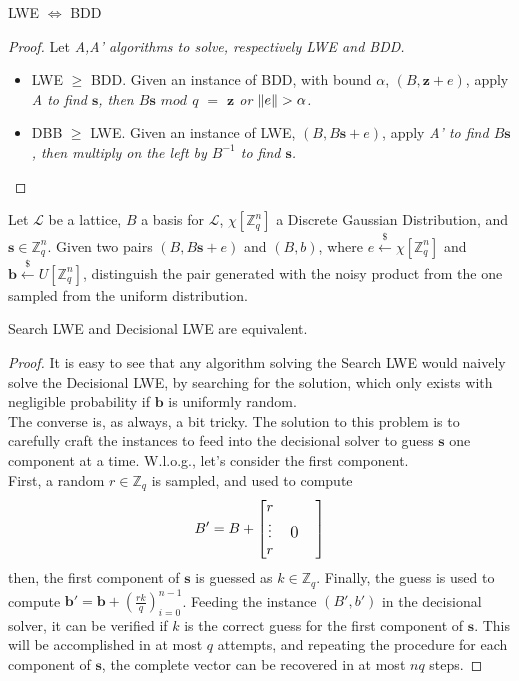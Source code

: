 \begin{theorem}
LWE $\Leftrightarrow$ BDD
\end{theorem}
\begin{proof}
Let \it{A},\it{A'} algorithms to solve, respectively LWE and BDD.
\begin{itemize}
\item LWE $\geq$ BDD. Given an instance of BDD, with bound $\alpha$, $(B,\mathbf{z}+e)$, apply \it{A} to find $\mathbf{s}$, then $B\mathbf{s}$ $mod$ $q$ $=$ $\mathbf{z}$ or $\left\lVert e \right\rVert>\alpha$.
\item DBB $\geq$ LWE. Given an instance of LWE, $(B,B\mathbf{s}+e)$, apply \it{A'} to find $B\mathbf{s}$, then multiply on the left by $B^{-1}$ to find $\mathbf{s}$.
\end{itemize}
\end{proof}

\begin{definition}
Let $\mathscr{L}$ be a lattice, $B$ a basis for $\mathscr{L}$, $\chi[\mathbb{Z}_q^n]$ a Discrete Gaussian Distribution, and $\mathbf{s}\in\mathbb{Z}_q^n$. Given two pairs $(B, B\mathbf{s}+e)$ and $(B,b)$, where $e\xleftarrow{\$}\chi[\mathbb{Z}_q^n]$ and $\mathbf{b}\xleftarrow{\$}U[\mathbb{Z}_q^n]$, distinguish the pair generated with the noisy product from the one sampled from the uniform distribution.
\end{definition}

\begin{theorem}
Search LWE and Decisional LWE are equivalent.
\end{theorem}
\begin{proof}
It is easy to see that any algorithm solving the Search LWE would naively solve the Decisional LWE, by searching for the solution, which only exists with negligible probability if $\mathbf{b}$ is uniformly random.\\
The converse is, as always, a bit tricky. The solution to this problem is to carefully craft the instances to feed into the decisional solver to guess $\mathbf{s}$ one component at a time.
W.l.o.g., let's consider the first component.\\
First, a random $r\in\mathbb{Z}_q$ is sampled, and used to compute
\begin{equation*}
B'=B+
\begin{bmatrix}
r &&&\\
\vdots &  \multicolumn{2}{c}{\text{\large0}}\\
r &&& \\
\end{bmatrix}
\end{equation*}
then, the first component of $\mathbf{s}$ is guessed as $k\in\mathbb{Z}_q$. Finally, the guess is used to compute $\mathbf{b}'=\mathbf{b}+\left(\frac{rk}{q}\right)_{i=0}^{n-1}$. Feeding the instance $(B',b')$ in the decisional solver, it can be verified if $k$ is the correct guess for the first component of $\mathbf{s}$. This will be accomplished in at most $q$ attempts, and repeating the procedure for each component of $\mathbf{s}$, the complete vector can be recovered in at most $nq$ steps.
\end{proof}

